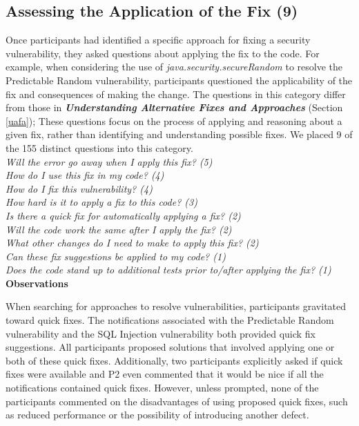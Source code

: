 \documentclass[conference]{IEEEtran}
\begin{document}

\noindent\subsection{\textbf{Assessing the Application of the Fix (9)}}\label{aaf}
Once participants had identified a specific approach for fixing a security vulnerability, they asked questions about applying the fix to the code.
For example, when considering the use of \textit{java.security.secureRandom} to resolve the Predictable Random vulnerability, participants questioned the applicability of the fix and consequences of making the change. 
The questions in this category differ from those in \emph{\textbf{Understanding Alternative Fixes and Approaches}} (Section \ref{uafa}); 
These questions focus on the process of applying  and reasoning about a given fix, rather than identifying and understanding possible fixes.
We placed 9 of the 155 distinct questions into this category.
\\

\noindent\emph{Will the error go away when I apply this fix? (5)} \\
\emph{How do I use this fix in my code? (4)} \\
\emph{How do I fix this vulnerability? (4)} \\
\emph{How hard is it to apply a fix to this code? (3)} \\
\emph{Is there a quick fix for automatically applying a fix? (2)} \\
\emph{Will the code work the same after I apply the fix? (2)} \\
\emph{What other changes do I need to make to apply this fix? (2)} \\
\emph{Can these fix suggestions be applied to my code? (1)} \\
\emph{Does the code stand up to additional tests prior to/after applying the fix? (1)} \\


\noindent\textbf{Observations}

When searching for approaches to resolve vulnerabilities, participants gravitated toward quick fixes.
The notifications associated with the Predictable Random vulnerability and the SQL Injection vulnerability both provided quick fix suggestions.
All participants proposed solutions that involved applying one or both of these quick fixes. 
Additionally, two participants explicitly asked if quick fixes were available and P2 even commented that it would be nice if all the notifications contained quick fixes.
However, unless prompted, none of the participants commented on the disadvantages of using proposed quick fixes, such as reduced performance or the possibility of introducing another defect.
 
\end{document}
